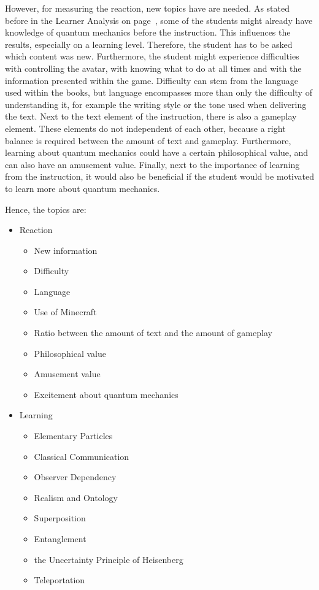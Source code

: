 \documentclass[11pt,twoside]{report} %
\begin{document}
However, for measuring the reaction, new topics have are needed. As stated before in the Learner Analysis on page~\pageref{ch:learneranalysis}, some of the students might already have knowledge of quantum mechanics before the instruction. This influences the results, especially on a learning level. Therefore, the student has to be asked which content was new. Furthermore, the student might experience difficulties with controlling the avatar, with knowing what to do at all times and with the information presented within the game. Difficulty can stem from the language used within the books, but language encompasses more than only the difficulty of understanding it, for example the writing style or the tone used when delivering the text. Next to the text element of the instruction, there is also a gameplay element. These elements do not independent of each other, because a right balance is required between the amount of text and gameplay. Furthermore, learning about quantum mechanics could have a certain philosophical value, and can also have an amusement value. Finally, next to the importance of learning from the instruction, it would also be beneficial if the student would be motivated to learn more about quantum mechanics.

Hence, the topics are:
\begin{itemize}
	\item Reaction
	\begin{itemize}
		\item New information
		\item Difficulty
		\item Language
		\item Use of Minecraft
		\item Ratio between the amount of text and the amount of gameplay
		\item Philosophical value
		\item Amusement value
		\item Excitement about quantum mechanics
	\end{itemize}
	\item Learning
	\begin{itemize}
		\item Elementary Particles
		\item Classical Communication
		\item Observer Dependency
		\item Realism and Ontology
		\item Superposition
		\item Entanglement
		\item the Uncertainty Principle of Heisenberg
		\item Teleportation
	\end{itemize}
\end{itemize}
\end{document}
